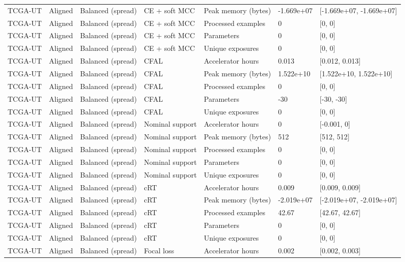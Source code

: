 \begin{longtable}{lllllll}
TCGA-UT & Aligned & Balanced (spread) & CE + soft MCC & Peak memory (bytes) & -1.669e+07 & [-1.669e+07, -1.669e+07] \\
TCGA-UT & Aligned & Balanced (spread) & CE + soft MCC & Processed examples & 0 & [0, 0] \\
TCGA-UT & Aligned & Balanced (spread) & CE + soft MCC & Parameters & 0 & [0, 0] \\
TCGA-UT & Aligned & Balanced (spread) & CE + soft MCC & Unique exposures & 0 & [0, 0] \\
TCGA-UT & Aligned & Balanced (spread) & CFAL & Accelerator hours & 0.013 & [0.012, 0.013] \\
TCGA-UT & Aligned & Balanced (spread) & CFAL & Peak memory (bytes) & 1.522e+10 & [1.522e+10, 1.522e+10] \\
TCGA-UT & Aligned & Balanced (spread) & CFAL & Processed examples & 0 & [0, 0] \\
TCGA-UT & Aligned & Balanced (spread) & CFAL & Parameters & -30 & [-30, -30] \\
TCGA-UT & Aligned & Balanced (spread) & CFAL & Unique exposures & 0 & [0, 0] \\
TCGA-UT & Aligned & Balanced (spread) & Nominal support & Accelerator hours & 0 & [-0.001, 0] \\
TCGA-UT & Aligned & Balanced (spread) & Nominal support & Peak memory (bytes) & 512 & [512, 512] \\
TCGA-UT & Aligned & Balanced (spread) & Nominal support & Processed examples & 0 & [0, 0] \\
TCGA-UT & Aligned & Balanced (spread) & Nominal support & Parameters & 0 & [0, 0] \\
TCGA-UT & Aligned & Balanced (spread) & Nominal support & Unique exposures & 0 & [0, 0] \\
TCGA-UT & Aligned & Balanced (spread) & cRT & Accelerator hours & 0.009 & [0.009, 0.009] \\
TCGA-UT & Aligned & Balanced (spread) & cRT & Peak memory (bytes) & -2.019e+07 & [-2.019e+07, -2.019e+07] \\
TCGA-UT & Aligned & Balanced (spread) & cRT & Processed examples & 42.67 & [42.67, 42.67] \\
TCGA-UT & Aligned & Balanced (spread) & cRT & Parameters & 0 & [0, 0] \\
TCGA-UT & Aligned & Balanced (spread) & cRT & Unique exposures & 0 & [0, 0] \\
TCGA-UT & Aligned & Balanced (spread) & Focal loss & Accelerator hours & 0.002 & [0.002, 0.003] \\

\end{longtable}

